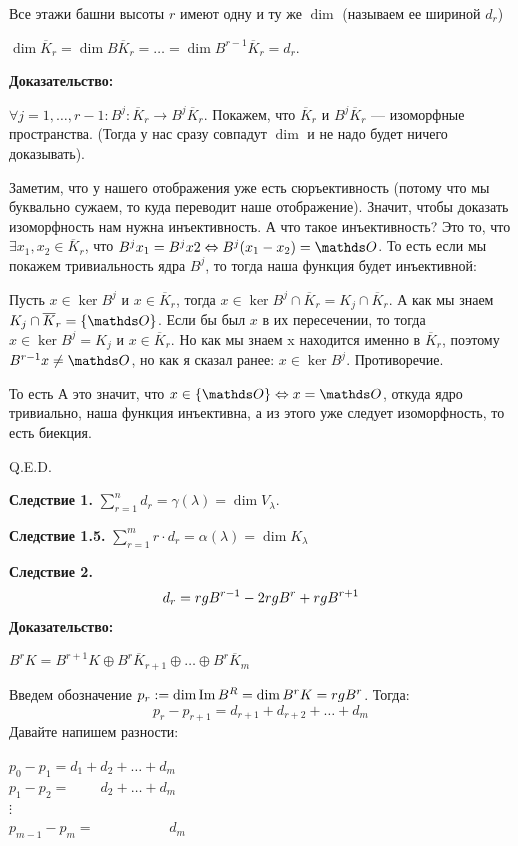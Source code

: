 Все этажи башни высоты $r$ имеют одну и ту же $\dim$ (называем ее шириной $d_r$)

$\dim \overline{K}_r = \dim B \overline{K}_r = \ldots = \dim B^{r-1}\overline{K}_r = d_r$.

\textbf{Доказательство:}

$\forall j=1,\ldots,r-1:B^j: \overline{K}_r \rightarrow B^j\overline{K}_r$. Покажем, что $\overline{K}_r $ и $B^j\overline{K}_r$ --- изоморфные пространства. (Тогда у нас сразу совпадут $\dim$ и не надо будет ничего доказывать).

Заметим, что у нашего отображения уже есть сюръективность (потому что мы буквально сужаем, то куда переводит наше отображение). Значит, чтобы доказать изоморфность нам нужна инъективность. А что такое инъективность? Это то, что $\exists x_1,x_2 \in \overline{K}_r$, что $B^jx_1=B^jx2 \Leftrightarrow B^j(x_1-x_2)=\zero$. То есть если мы покажем тривиальность ядра $B^j$, то тогда наша функция будет инъективной:

Пусть $x \in \ker B^j$ и $x\in \overline{K}_r$, тогда $x\in \ker B^j \cap \overline{K}_r = K_j \cap \overline{K}_r$. А как мы знаем $ K_j \cap \overline{K}_r = \{\zero\}$. Если бы был $x$ в их пересечении, то тогда $x \in \ker B^j =K_j$ и $x \in \overline{K}_{r}$. Но как мы знаем x находится именно в $\overline{K}_r$, поэтому $B^{r-1}x \neq \zero$, но как я сказал ранее:  $x \in \ker B^j $. Противоречие.

То есть  А это значит, что $x \in \{\zero\} \Leftrightarrow x =\zero$, откуда ядро тривиально, наша функция инъективна, а из этого уже следует изоморфность, то есть биекция.

\hfill Q.E.D.

\textbf{Следствие 1.} $\sum\limits_{r=1}^nd_r = \gamma(\lambda) = \dim V_{\lambda}$.

\textbf{Следствие 1.5.} $\sum\limits_{r=1}^m r \cdot d_r = \alpha(\lambda)= \dim K_{\lambda}$

\textbf{Следствие 2.} 
$$d_r = rg B^{r-1}-2 rg B^r + rg B^{r+1}$$
\textbf{Доказательство:}

$B^rK = B^{r+1}K \oplus B^r\overline{K}_{r+1}\oplus\ldots\oplus B^r \overline{K}_m$

Введем обозначение $p_r:=\dim \operatorname{Im} B^R = \dim B^rK = rg B^r$. Тогда:
$$p_r - p_{r+1} = d_{r+1}+d_{r+2}+\ldots +d_m$$ 
Давайте напишем разности:

$p_0-p_1 = d_1 + d_2 +\ldots + d_m$\\
$p_1-p_2 = \quad\quad\, d_2 + \ldots + d_m$\\
$\vdots$\\
$p_{m-1}-p_m = \quad\quad\quad\quad \quad \,\,d_m$

